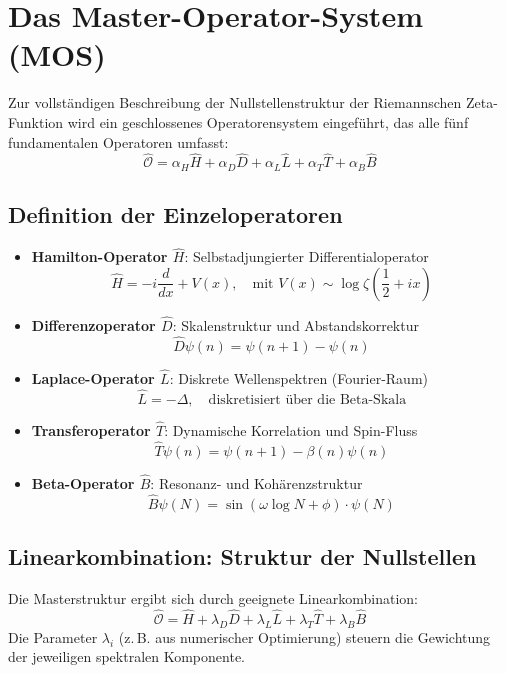 \section{Das Master-Operator-System (MOS)}

Zur vollständigen Beschreibung der Nullstellenstruktur der Riemannschen Zeta-Funktion wird ein geschlossenes Operatorensystem eingeführt, das alle fünf fundamentalen Operatoren umfasst:
\[
\boxed{
\hat{\mathcal{O}} = \alpha_H \hat{H} + \alpha_D \hat{D} + \alpha_L \hat{L} + \alpha_T \hat{T} + \alpha_B \hat{B}
}
\]

\subsection{Definition der Einzeloperatoren}

\begin{itemize}
    \item \textbf{Hamilton-Operator \(\hat{H}\)}: Selbstadjungierter Differentialoperator
    \[
    \hat{H} = -i \frac{d}{dx} + V(x), \quad \text{mit } V(x) \sim \log \zeta\left(\frac{1}{2} + i x\right)
    \]

    \item \textbf{Differenzoperator \(\hat{D}\)}: Skalenstruktur und Abstandskorrektur
    \[
    \hat{D} \psi(n) = \psi(n+1) - \psi(n)
    \]

    \item \textbf{Laplace-Operator \(\hat{L}\)}: Diskrete Wellenspektren (Fourier-Raum)
    \[
    \hat{L} = -\Delta, \quad \text{diskretisiert über die Beta-Skala}
    \]

    \item \textbf{Transferoperator \(\hat{T}\)}: Dynamische Korrelation und Spin-Fluss
    \[
    \hat{T} \psi(n) = \psi(n+1) - \beta(n) \psi(n)
    \]

    \item \textbf{Beta-Operator \(\hat{B}\)}: Resonanz- und Kohärenzstruktur
    \[
    \hat{B} \psi(N) = \sin(\omega \log N + \phi) \cdot \psi(N)
    \]
\end{itemize}

\subsection{Linearkombination: Struktur der Nullstellen}

Die Masterstruktur ergibt sich durch geeignete Linearkombination:
\[
\hat{\mathcal{O}} = \hat{H} + \lambda_D \hat{D} + \lambda_L \hat{L} + \lambda_T \hat{T} + \lambda_B \hat{B}
\]
Die Parameter \(\lambda_i\) (z.\,B. aus numerischer Optimierung) steuern die Gewichtung der jeweiligen spektralen Komponente.

